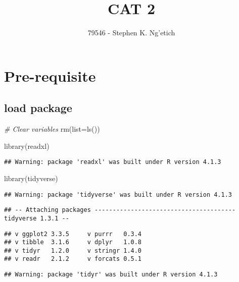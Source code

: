 \documentclass[
]{article}
\title{CAT 2}
\author{79546 - Stephen K. Ng'etich}
\date{}
\newenvironment{Shaded}{\begin{snugshade}}{\end{snugshade}}
\newcommand{\AttributeTok}[1]{\textcolor[rgb]{0.77,0.63,0.00}{#1}}
\newcommand{\CommentTok}[1]{\textcolor[rgb]{0.56,0.35,0.01}{\textit{#1}}}
\newcommand{\FunctionTok}[1]{\textcolor[rgb]{0.00,0.00,0.00}{#1}}
\newcommand{\NormalTok}[1]{#1}
\begin{document}
\maketitle

{
\setcounter{tocdepth}{3}
\tableofcontents
}
\hypertarget{pre-requisite}{%
\section{Pre-requisite}\label{pre-requisite}}

\hypertarget{load-package}{%
\subsection{load package}\label{load-package}}

\begin{Shaded}
\begin{Highlighting}[]
\CommentTok{\# Clear variables}
\FunctionTok{rm}\NormalTok{(}\AttributeTok{list=}\FunctionTok{ls}\NormalTok{())}

\FunctionTok{library}\NormalTok{(readxl)}
\end{Highlighting}
\end{Shaded}

\begin{verbatim}
## Warning: package 'readxl' was built under R version 4.1.3
\end{verbatim}

\begin{Shaded}
\begin{Highlighting}[]
\FunctionTok{library}\NormalTok{(tidyverse)}
\end{Highlighting}
\end{Shaded}

\begin{verbatim}
## Warning: package 'tidyverse' was built under R version 4.1.3
\end{verbatim}

\begin{verbatim}
## -- Attaching packages --------------------------------------- tidyverse 1.3.1 --
\end{verbatim}

\begin{verbatim}
## v ggplot2 3.3.5     v purrr   0.3.4
## v tibble  3.1.6     v dplyr   1.0.8
## v tidyr   1.2.0     v stringr 1.4.0
## v readr   2.1.2     v forcats 0.5.1
\end{verbatim}

\begin{verbatim}
## Warning: package 'tidyr' was built under R version 4.1.3
\end{verbatim}
\end{document}
